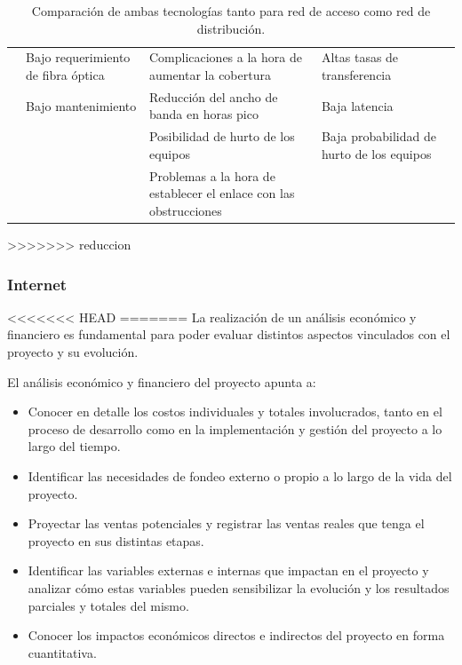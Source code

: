 \documentclass[11pt,a4paper]{article}
\begin{document}
\begin{table}[htbp]
{\begin{tabular}{|c|C{0.25\textwidth}|C{0.25\textwidth}|C{0.25\textwidth}|C{0.25\textwidth}|}
         & Bajo requerimiento de fibra óptica & Complicaciones a la hora de aumentar la cobertura & Altas tasas de transferencia &  \bigstrut\\
         & Bajo mantenimiento & Reducción del ancho de banda en horas pico & Baja latencia &  \bigstrut\\
         &      & Posibilidad de hurto de los equipos & Baja probabilidad de hurto de los equipos &  \bigstrut\\
         &      & Problemas a la hora de establecer el enlace  con las obstrucciones  &      &  \bigstrut\\
    \hline
    \end{tabular}}%
    \caption{Comparación de ambas tecnologías tanto para red de acceso como red de distribución.}
  \label{tab:comp_tec}%
\end{table}%


>>>>>>> reduccion

\subsubsection{Internet}

<<<<<<< HEAD
=======
La realización de un análisis económico y financiero es fundamental para poder evaluar distintos aspectos vinculados con el proyecto y su evolución. 

El análisis económico y financiero del proyecto apunta a:

\begin{itemize}
    \item Conocer en detalle los costos individuales y totales involucrados, tanto en el proceso de desarrollo como en la implementación y gestión del proyecto a lo largo del tiempo.
    \item Identificar las necesidades de fondeo externo o propio a lo largo de la vida del proyecto. 
    \item Proyectar las ventas potenciales y registrar las ventas reales que tenga el proyecto en sus distintas etapas. 
    \item Identificar las variables externas e internas que impactan en el proyecto y analizar cómo estas variables pueden sensibilizar la evolución y los resultados parciales y totales del mismo. 
    \item Conocer los impactos económicos directos e indirectos del proyecto en forma cuantitativa.
\end{itemize}
\end{document}
